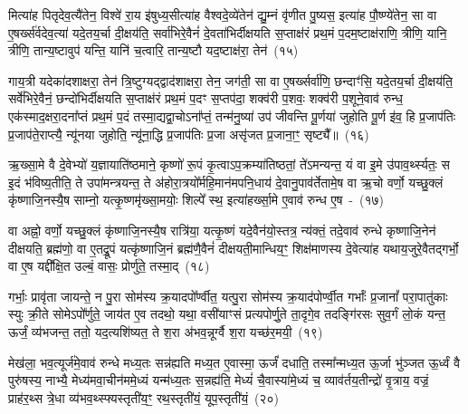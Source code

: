 मित्या॑ह पितृदेव॒त्यै॑तेन॒ विश्वे॑ रा॒य इ॑षुध्य॒सीत्या॑ह वैश्वदे॒व्ये॑तेन॑ द्यु॒म्नं वृ॑णीत पु॒ष्यस॒ इत्या॑ह पौ॒ष्ण्ये॑तेन॒ सा वा ए॒षर्ख्स॑र्वदेव॒त्या॑ यदे॒तय॒र्चा दी॒क्षय॑ति॒ सर्वा॑भिरे॒वैनं॑ दे॒वता॑भिर्दीक्षयति स॒प्ताक्ष॑रं प्रथ॒मं प॒दम॒ष्टाक्ष॑राणि॒ त्रीणि॒ यानि॒ त्रीणि॒ तान्य॒ष्टावुप॑ यन्ति॒ यानि॑ च॒त्वारि॒ तान्य॒ष्टौ यद॒ष्टाक्ष॑रा॒ तेन॑~(१५)\ip

गाय॒त्री यदेका॑\-दशाक्षरा॒ तेन॑ त्रि॒ष्टुग्यद्द्वाद॑शाक्षरा॒ तेन॒ जग॑ती॒ सा वा ए॒षर्ख्सर्वा॑णि॒ छन्दाꣳ॑सि॒ यदे॒तय॒र्चा दी॒क्षय॑ति॒ सर्वे॑भिरे॒वैनं॒ छन्दो॑भिर्दीक्षयति स॒प्ताक्ष॑रं प्रथ॒मं प॒दꣳ स॒प्तप॑दा॒ शक्व॑री प॒शवः॒ शक्व॑री प॒शूने॒वाव॑ रुन्ध॒ एक॑स्माद॒क्षरा॒दना᳚प्तं प्रथ॒मं प॒दं तस्मा॒द्यद्वा॒चो\-ऽना᳚प्तं॒ तन्म॑नु॒ष्या॑ उप॑ जीवन्ति पू॒र्णया॑ जुहोति पू॒र्ण इ॑व॒ हि प्र॒जा\-प॑तिः प्र॒जा\-प॑ते॒राप्त्यै॒ न्यू॑नया जुहोति॒ न्यू॑ना॒द्धि प्र॒जा\-प॑तिः प्र॒जा असृ॑जत प्र॒जाना॒ꣳ॒ सृष्ट्यै᳚॥~(१६)\ip

{\anuvakamend[{अ॒ग्नये॒ ता वृ॑धात्वृ॒चा स॒ख्यन्तेन॑ जुहोति॒ पञ्च॑दश च}]}

ऋ॒ख्सा॒मे वै दे॒वेभ्यो॑ य॒ज्ञायाति॑ष्ठमाने॒ कृष्णो॑ रू॒पं कृ॒त्वा\-ऽप॒क्रम्या॑तिष्ठतां॒ ते॑\-ऽमन्यन्त॒ यं वा इ॒मे उ॑पाव॒र्थ्स्यतः॒ स इ॒दं भ॑विष्य॒तीति॒ ते उपा॑मन्त्रयन्त॒ ते अ॑होरा॒त्रयो᳚र्महि॒मान॑मपनि॒धाय॑ दे॒वानु॒पाव॑र्तेतामे॒ष वा ऋ॒चो वर्णो॒ यच्छु॒क्लं कृ॑ष्णाजि॒नस्यै॒ष साम्नो॒ यत्कृ॒ष्णमृ॑ख्सा॒मयोः॒ शिल्पे᳚ स्थ॒ इत्या॑हर्ख्सा॒मे ए॒वाव॑ रुन्ध ए॒ष~-~(१७)\ip

वा अह्नो॒ वर्णो॒ यच्छु॒क्लं कृ॑ष्णाजि॒नस्यै॒ष रात्रि॑या॒ यत्कृ॒ष्णं यदे॒वैन॑यो॒स्तत्र॒ न्य॑क्तं॒ तदे॒वाव॑ रुन्धे कृष्णाजि॒नेन॑ दीक्षयति॒ ब्रह्म॑णो॒ वा ए॒तद्रू॒पं यत्कृ॑ष्णाजि॒नं ब्रह्म॑णै॒वैनं॑ दीक्षयती॒मान्धिय॒ꣳ॒ शिक्ष॑माणस्य दे॒वेत्या॑ह यथाय॒जुरे॒वैतद्गर्भो॒ वा ए॒ष यद्दी᳚क्षि॒त उल्बं॒ वासः॒ प्रोर्णु॑ते॒ तस्मा॒द्~(१८)\ip

गर्भाः॒ प्रावृ॑ता जायन्ते॒ न पु॒रा सोम॑स्य क्र॒यादपो᳚र्ण्वीत॒ यत्पु॒रा सोम॑स्य क्र॒याद॑पोर्ण्वी॒त गर्भाः᳚ प्र॒जानां᳚ परा॒पातु॑काः स्युः क्री॒ते सोमे\-ऽपो᳚र्णुते॒ जाय॑त ए॒व तदथो॒ यथा॒ वसी॑याꣳसं प्रत्यपोर्णु॒ते ता॒दृगे॒व तदङ्गि॑रसः सुव॒र्गं लो॒कं यन्त॒ ऊर्जं॒ व्य॑भजन्त॒ ततो॒ यद॒त्यशि॑ष्यत॒ ते श॒रा अ॑भव॒न्नूर्ग्वै श॒रा यच्छ॑र॒मयी॒~(१९)\ip

मेख॑ला॒ भव॒त्यूर्ज॑मे॒वाव॑ रुन्धे मध्य॒तः सन्न॑ह्यति मध्य॒त ए॒वास्मा॒ ऊर्जं॑ दधाति॒ तस्मा᳚न्मध्य॒त ऊ॒र्जा भु॑ञ्जत ऊ॒र्ध्वं वै पुरु॑षस्य॒ नाभ्यै॒ मेध्य॑मवा॒चीन॑ममे॒ध्यं यन्म॑ध्य॒तः स॒न्नह्य॑ति॒ मेध्यं॑ चै॒वास्या॑मे॒ध्यं च॒ व्याव॑र्तय॒तीन्द्रो॑ वृ॒त्राय॒ वज्रं॒ प्राह॑र॒थ्स त्रे॒धा व्य॑भव॒थ्स्फ्यस्तृती॑य॒ꣳ॒ रथ॒स्तृती॑यं॒ यूप॒स्तृती॑यं॒~(२०)\ip

